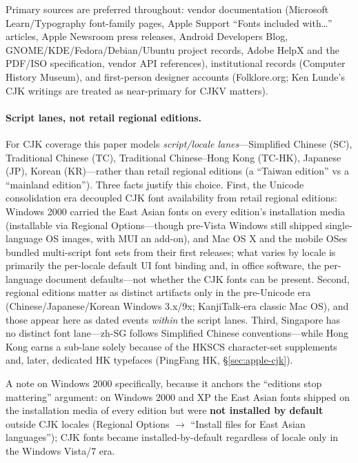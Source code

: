 \documentclass[10pt,a4paper]{article}
\begin{document}
Primary sources are preferred throughout: vendor documentation (Microsoft
Learn/Typography font-family pages, Apple Support ``Fonts included with\ldots''
articles, Apple Newsroom press releases, Android Developers Blog,
GNOME/KDE/Fedora/Debian/Ubuntu project records, Adobe HelpX and the PDF/ISO
specification, vendor API references), institutional records (Computer History
Museum), and first-person designer accounts (Folklore.org; Ken Lunde's CJK writings
are treated as near-primary for CJKV matters).

\paragraph{Script lanes, not retail regional editions.} For CJK coverage this paper
models \emph{script/locale lanes}---Simplified Chinese (SC), Traditional Chinese
(TC), Traditional Chinese--Hong Kong (TC-HK), Japanese (JP), Korean (KR)---rather
than retail regional editions (a ``Taiwan edition'' vs a ``mainland edition''). Three
facts justify this choice. First, the Unicode consolidation era decoupled CJK font
availability from retail regional editions: Windows 2000 carried the East Asian fonts
on every edition's installation media (installable via Regional Options---though
pre-Vista Windows still shipped single-language OS images, with MUI an add-on), and
Mac OS X and the mobile OSes bundled multi-script font sets from their first releases;
what varies by locale is primarily the per-locale default UI font binding and, in
office software, the per-language document defaults---not whether the CJK fonts can be
present.\cite{m-w2k,m-w2k-2} Second, regional editions matter as distinct artifacts
only in the pre-Unicode era (Chinese/Japanese/Korean Windows 3.x/9x; KanjiTalk-era
classic Mac OS), and those appear here as dated events \emph{within} the script
lanes. Third, Singapore has no distinct font lane---zh-SG follows Simplified Chinese
conventions---while Hong Kong earns a sub-lane solely because of the HKSCS
character-set supplements and, later, dedicated HK typefaces (PingFang HK,
\S\ref{sec:apple-cjk}).\cite{m-hkscs}

A note on Windows 2000 specifically, because it anchors the ``editions stop
mattering'' argument: on Windows 2000 and XP the East Asian fonts shipped on the
installation media of every edition but were \textbf{not installed by default}
outside CJK locales (Regional Options $\rightarrow$ ``Install files for East Asian
languages''); CJK fonts became installed-by-default regardless of locale only in the
Windows Vista/7 era.\cite{m-w2k-install}
\end{document}
